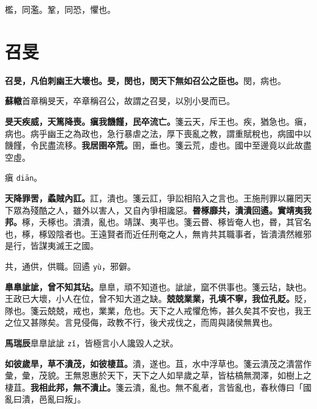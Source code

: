 \begin{quoting}檻，同濫。鞏，同恐，懼也。\end{quoting}

\section{召旻}


\textbf{召旻，凡伯刺幽王大壞也。旻，閔也，閔天下無如召公之臣也。}{\footnotesize 閔，病也。}

\begin{quoting}\textbf{蘇轍}首章稱旻天，卒章稱召公，故謂之召旻，以別小旻而已。\end{quoting}

\textbf{旻天疾威，天篤降喪。瘨我饑饉，民卒流亡。}{\footnotesize 箋云天，斥王也。疾，猶急也。瘨，病也。病乎幽王之為政也，急行暴虐之法，厚下喪亂之教，謂重賦稅也，病國中以饑饉，令民盡流移。}\textbf{我居圉卒荒。}{\footnotesize 圉，垂也。箋云荒，虛也。國中至邊竟以此故盡空虛。}

\begin{quoting}瘨 \texttt{diān}。\end{quoting}

\textbf{天降罪罟，蟊賊內訌。}{\footnotesize 訌，潰也。箋云訌，爭訟相陷入之言也。王施刑罪以羅罔天下眾為殘酷之人，雖外以害人，又自內爭相讒惡。}\textbf{昬椓靡共，潰潰回遹。實靖夷我邦。}{\footnotesize 椓，夭椓也。潰潰，亂也。靖謀、夷平也。箋云昬、椓皆奄人也，昬，其官名也，椓，椓毀陰者也。王遠賢者而近任刑奄之人，無肯共其職事者，皆潰潰然維邪是行，皆謀夷滅王之國。}

\begin{quoting}共，通供，供職。回遹 \texttt{yù}，邪僻。\end{quoting}

\textbf{臯臯訿訿，曾不知其玷。}{\footnotesize 臯臯，頑不知道也。訿訿，窳不供事也。箋云玷，缺也。王政已大壞，小人在位，曾不知大道之缺。}\textbf{兢兢業業，孔填不寧，我位孔貶。}{\footnotesize 貶，隊也。箋云兢兢，戒也，業業，危也。天下之人戒懼危怖，甚久矣其不安也，我王之位又甚隊矣。言見侵侮，政教不行，後犬戎伐之，而周與諸侯無異也。}

\begin{quoting}\textbf{馬瑞辰}臯臯訿訿 \texttt{zǐ}，皆極言小人讒毀人之狀。\end{quoting}

\textbf{如彼歲旱，草不潰茂，如彼棲苴。}{\footnotesize 潰，遂也。苴，水中浮草也。箋云潰茂之潰當作彙，彙，茂貌。王無恩惠於天下，天下之人如旱歲之草，皆枯槁無潤澤，如樹上之棲苴。}\textbf{我相此邦，無不潰止。}{\footnotesize 箋云潰，亂也。無不亂者，言皆亂也，春秋傳曰「國亂曰潰，邑亂曰叛」。}

